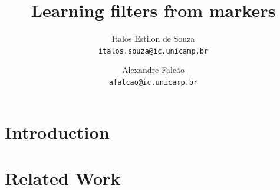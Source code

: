 \documentclass[a4paper,conference]{IEEEtran}
\begin{document}
\title{Learning filters from markers}
\author{Italos Estilon de Souza\\
{\tt\small italos.souza@ic.unicamp.br}
\and
Alexandre Falcão\\
{\tt\small afalcao@ic.unicamp.br}
}

\maketitle



\section{Introduction}

\section{Related Work}
\end{document}
